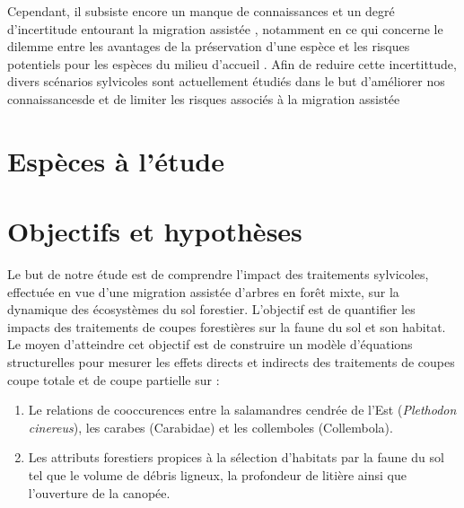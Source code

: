 Cependant, il subsiste encore un manque de connaissances et un degré d'incertitude entourant la migration assistée \citep{Park2018Informationunderload,Klenk2015assistedmigration}, 
notamment en ce qui concerne le dilemme entre les avantages de la préservation d'une espèce et les risques potentiels pour les espèces du milieu d'accueil \citep{Hewitt2011Takingstock,McLachlan2007frameworkdebate,Vitt2010Assistedmigration}.
Afin de reduire cette incertittude, divers scénarios sylvicoles sont actuellement étudiés dans le but d'améliorer nos connaissancesde et de limiter les risques associés à la migration assistée \citep{royoDesiredREgenerationAssisted2023}


\section*{Espèces à l'étude}
\label{sec:species}


\section*{Objectifs et hypothèses}
\label{sec:objectifs}

Le but de notre étude est de comprendre l'impact des traitements sylvicoles, effectuée en vue d'une migration assistée d'arbres en forêt mixte, sur la dynamique des écosystèmes du sol forestier.
L'objectif est de quantifier les impacts des traitements de coupes forestières sur la faune du sol et son habitat. 
Le moyen d'atteindre cet objectif est de construire un modèle d'équations structurelles pour mesurer les effets directs et indirects des traitements de coupes coupe totale et de coupe partielle sur : 

\begin{enumerate}
    \item Le relations de cooccurences entre la salamandres cendrée de l'Est (\textit{Plethodon cinereus}), les carabes (Carabidae) et les collemboles (Collembola).
    \item Les attributs forestiers propices à la sélection d'habitats par la faune du sol tel que le volume de débris ligneux, la profondeur de litière ainsi que l'ouverture de la canopée. 
\end{enumerate}



